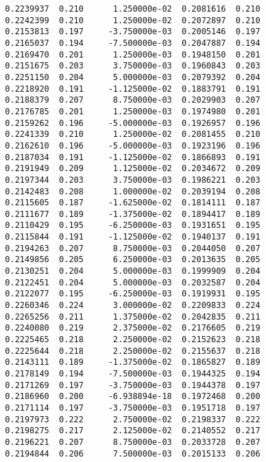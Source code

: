 \documentclass[
  letterpaper,
  DIV=11,
  numbers=noendperiod]{scrartcl}
\begin{document}
\begin{verbatim}
  0.2239937  0.210      1.250000e-02  0.2081616  0.210           
  0.2242399  0.210      1.250000e-02  0.2072897  0.210           
  0.2153813  0.197     -3.750000e-03  0.2005146  0.197           
  0.2165037  0.194     -7.500000e-03  0.2047887  0.194           
  0.2169470  0.201      1.250000e-03  0.1948150  0.201           
  0.2151675  0.203      3.750000e-03  0.1960843  0.203           
  0.2251150  0.204      5.000000e-03  0.2079392  0.204           
  0.2218920  0.191     -1.125000e-02  0.1883791  0.191           
  0.2188379  0.207      8.750000e-03  0.2029903  0.207           
  0.2176785  0.201      1.250000e-03  0.1974980  0.201           
  0.2159262  0.196     -5.000000e-03  0.1926957  0.196           
  0.2241339  0.210      1.250000e-02  0.2081455  0.210           
  0.2162610  0.196     -5.000000e-03  0.1923196  0.196           
  0.2187034  0.191     -1.125000e-02  0.1866893  0.191           
  0.2191949  0.209      1.125000e-02  0.2034672  0.209           
  0.2197344  0.203      3.750000e-03  0.1986221  0.203           
  0.2142483  0.208      1.000000e-02  0.2039194  0.208           
  0.2115605  0.187     -1.625000e-02  0.1814111  0.187           
  0.2111677  0.189     -1.375000e-02  0.1894417  0.189           
  0.2110429  0.195     -6.250000e-03  0.1931651  0.195           
  0.2115844  0.191     -1.125000e-02  0.1940137  0.191           
  0.2194263  0.207      8.750000e-03  0.2044050  0.207           
  0.2149856  0.205      6.250000e-03  0.2013635  0.205           
  0.2130251  0.204      5.000000e-03  0.1999909  0.204           
  0.2122451  0.204      5.000000e-03  0.2032587  0.204           
  0.2122077  0.195     -6.250000e-03  0.1919931  0.195           
  0.2260346  0.224      3.000000e-02  0.2209833  0.224           
  0.2265256  0.211      1.375000e-02  0.2042835  0.211           
  0.2240080  0.219      2.375000e-02  0.2176605  0.219           
  0.2225465  0.218      2.250000e-02  0.2152623  0.218           
  0.2225644  0.218      2.250000e-02  0.2155637  0.218           
  0.2143111  0.189     -1.375000e-02  0.1865827  0.189           
  0.2178149  0.194     -7.500000e-03  0.1944325  0.194           
  0.2171269  0.197     -3.750000e-03  0.1944378  0.197           
  0.2186960  0.200     -6.938894e-18  0.1972468  0.200           
  0.2171114  0.197     -3.750000e-03  0.1951718  0.197           
  0.2197973  0.222      2.750000e-02  0.2198337  0.222           
  0.2198275  0.217      2.125000e-02  0.2140552  0.217           
  0.2196221  0.207      8.750000e-03  0.2033728  0.207           
  0.2194844  0.206      7.500000e-03  0.2015133  0.206           

\end{verbatim}
\end{document}

